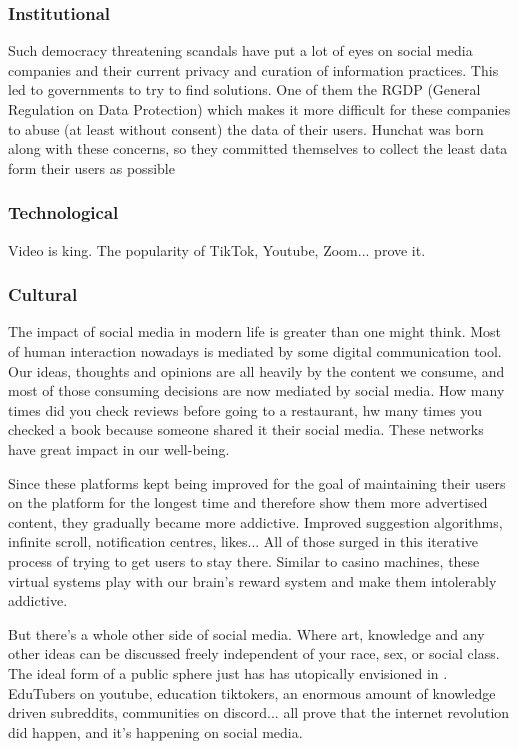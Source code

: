 \documentclass[12pt]{article}
\begin{document}
	\subsubsection{Institutional}
	Such democracy threatening scandals have put a lot of eyes on social media companies and their current privacy and curation of information practices. This led to governments to try to find solutions. One of them the RGDP (General Regulation on Data Protection) which makes it more difficult for these companies to abuse (at least without consent) the data of their users. Hunchat was born along with these concerns, so they committed themselves to collect the least data form their users as possible
	
	\subsubsection{Technological}
	Video is king. The popularity of TikTok, Youtube, Zoom... prove it.
	
	\subsubsection{Cultural}
	The impact of social media in modern life is greater than one might think. Most of human interaction nowadays is mediated by some digital communication tool. Our ideas, thoughts and opinions are all heavily by the content we consume, and most of those consuming decisions are now mediated by social media. How many times did you check reviews before going to a restaurant, hw many times you checked a book because someone shared it their social media. These networks have great impact in our well-being.
	
	 Since these platforms kept being improved for the goal of maintaining their users on the platform for the longest time and therefore show them more advertised content, they gradually became more addictive. Improved suggestion algorithms, infinite scroll, notification centres, likes... All of those surged in this iterative process of trying to get users to stay there. Similar to casino machines, these virtual systems play with our brain's reward system and make them intolerably addictive. 
	 
	 But there's a whole other side of social media. Where art, knowledge and any other ideas can be discussed freely independent of your race, sex, or social class. The ideal form of a public sphere just has \citeauthor{habermas} has utopically envisioned in \citeyear{habermas}. EduTubers on youtube, education tiktokers, an enormous amount of knowledge driven subreddits, communities on discord... all prove that the internet revolution did happen, and it's happening on social media.
	 	 
\end{document}
